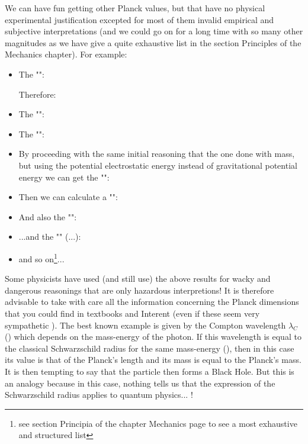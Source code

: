 	We can have fun getting other Planck values, but that have no physical experimental justification excepted for most of them invalid empirical and subjective interpretations (and we could go on for a long time with so many other magnitudes as we have give a quite exhaustive list in the section Principles of the Mechanics chapter). For example:
	\begin{itemize}
		\item The "":
		
		Therefore:
		
	
		\item The "":
		
	
		\item The "":
		
		
		\item By proceeding with the same initial reasoning that the one done with mass, but using the potential electrostatic energy instead of gravitational potential energy we can get the "":
		

		\item Then we can calculate a "":
		
		
		\item And also the "":
		
		
		\item ...and the "" (...):
		
	
		\item and so on\footnote{see section Principia of the chapter Mechanics page \pageref{planck constants} to see a most exhaustive and structured list}...
	\end{itemize}
	\begin{tcolorbox}[title=Remark,colframe=black,arc=10pt]
	Some physicists have used (and still use) the above results for wacky and dangerous reasonings that are only hazardous interpretions! It is therefore advisable to take with care all the information concerning the Planck dimensions  that you could find in textbooks and Interent (even if these seem very sympathetic ). The best known example is given by the Compton wavelength $\lambda_C$ () which depends on the mass-energy of the photon. If this wavelength is equal to the classical Schwarzschild radius for the same mass-energy (), then in this case its value is that of the Planck's length and its mass is equal to the Planck's mass. It is then tempting to say that the particle then forms a Black Hole. But this is an analogy because in this case, nothing tells us that the expression of the Schwarzschild radius applies to quantum physics... !
	\end{tcolorbox}
	
